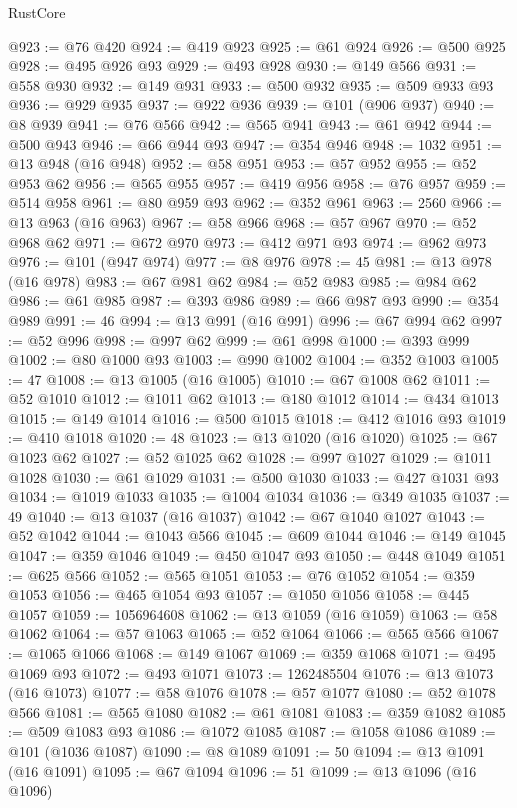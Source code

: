 \begin{lexlean}{RustCore}
\begin{coremodule}
@923 := @76 @420
@924 := @419 @923
@925 := @61 @924
@926 := @500 @925
@928 := @495 @926 @93
@929 := @493 @928
@930 := @149 @566
@931 := @558 @930
@932 := @149 @931
@933 := @500 @932
@935 := @509 @933 @93
@936 := @929 @935
@937 := @922 @936
@939 := @101 (@906 @937)
@940 := @8 @939
@941 := @76 @566
@942 := @565 @941
@943 := @61 @942
@944 := @500 @943
@946 := @66 @944 @93
@947 := @354 @946
@948 := 1032
@951 := @13 @948 (@16 @948)
@952 := @58 @951
@953 := @57 @952
@955 := @52 @953 @62
@956 := @565 @955
@957 := @419 @956
@958 := @76 @957
@959 := @514 @958
@961 := @80 @959 @93
@962 := @352 @961
@963 := 2560
@966 := @13 @963 (@16 @963)
@967 := @58 @966
@968 := @57 @967
@970 := @52 @968 @62
@971 := @672 @970
@973 := @412 @971 @93
@974 := @962 @973
@976 := @101 (@947 @974)
@977 := @8 @976
@978 := 45
@981 := @13 @978 (@16 @978)
@983 := @67 @981 @62
@984 := @52 @983
@985 := @984 @62
@986 := @61 @985
@987 := @393 @986
@989 := @66 @987 @93
@990 := @354 @989
@991 := 46
@994 := @13 @991 (@16 @991)
@996 := @67 @994 @62
@997 := @52 @996
@998 := @997 @62
@999 := @61 @998
@1000 := @393 @999
@1002 := @80 @1000 @93
@1003 := @990 @1002
@1004 := @352 @1003
@1005 := 47
@1008 := @13 @1005 (@16 @1005)
@1010 := @67 @1008 @62
@1011 := @52 @1010
@1012 := @1011 @62
@1013 := @180 @1012
@1014 := @434 @1013
@1015 := @149 @1014
@1016 := @500 @1015
@1018 := @412 @1016 @93
@1019 := @410 @1018
@1020 := 48
@1023 := @13 @1020 (@16 @1020)
@1025 := @67 @1023 @62
@1027 := @52 @1025 @62
@1028 := @997 @1027
@1029 := @1011 @1028
@1030 := @61 @1029
@1031 := @500 @1030
@1033 := @427 @1031 @93
@1034 := @1019 @1033
@1035 := @1004 @1034
@1036 := @349 @1035
@1037 := 49
@1040 := @13 @1037 (@16 @1037)
@1042 := @67 @1040 @1027
@1043 := @52 @1042
@1044 := @1043 @566
@1045 := @609 @1044
@1046 := @149 @1045
@1047 := @359 @1046
@1049 := @450 @1047 @93
@1050 := @448 @1049
@1051 := @625 @566
@1052 := @565 @1051
@1053 := @76 @1052
@1054 := @359 @1053
@1056 := @465 @1054 @93
@1057 := @1050 @1056
@1058 := @445 @1057
@1059 := 1056964608
@1062 := @13 @1059 (@16 @1059)
@1063 := @58 @1062
@1064 := @57 @1063
@1065 := @52 @1064
@1066 := @565 @566
@1067 := @1065 @1066
@1068 := @149 @1067
@1069 := @359 @1068
@1071 := @495 @1069 @93
@1072 := @493 @1071
@1073 := 1262485504
@1076 := @13 @1073 (@16 @1073)
@1077 := @58 @1076
@1078 := @57 @1077
@1080 := @52 @1078 @566
@1081 := @565 @1080
@1082 := @61 @1081
@1083 := @359 @1082
@1085 := @509 @1083 @93
@1086 := @1072 @1085
@1087 := @1058 @1086
@1089 := @101 (@1036 @1087)
@1090 := @8 @1089
@1091 := 50
@1094 := @13 @1091 (@16 @1091)
@1095 := @67 @1094
@1096 := 51
@1099 := @13 @1096 (@16 @1096)

\end{coremodule}
\end{lexlean}
